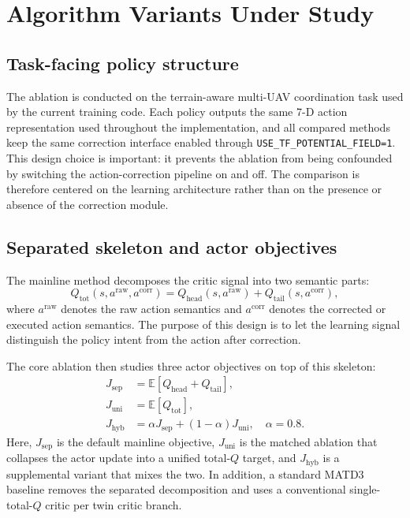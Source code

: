 \documentclass[a4paper,fleqn]{cas-dc}
\begin{document}
\section{Algorithm Variants Under Study}

\subsection{Task-facing policy structure}

The ablation is conducted on the terrain-aware multi-UAV coordination task used by the current training code. Each policy outputs the same 7-D action representation used throughout the implementation, and all compared methods keep the same correction interface enabled through \texttt{USE\_TF\_POTENTIAL\_FIELD=1}. This design choice is important: it prevents the ablation from being confounded by switching the action-correction pipeline on and off. The comparison is therefore centered on the learning architecture rather than on the presence or absence of the correction module.

\subsection{Separated skeleton and actor objectives}

The mainline method decomposes the critic signal into two semantic parts:
\begin{equation}
Q_{\text{tot}}(s, a^{\text{raw}}, a^{\text{corr}})
=
Q_{\text{head}}(s, a^{\text{raw}})
+
Q_{\text{tail}}(s, a^{\text{corr}}),
\label{eq:dual-q}
\end{equation}
where $a^{\text{raw}}$ denotes the raw action semantics and $a^{\text{corr}}$ denotes the corrected or executed action semantics. The purpose of this design is to let the learning signal distinguish the policy intent from the action after correction.

The core ablation then studies three actor objectives on top of this skeleton:
\begin{align}
J_{\text{sep}}   &= \mathbb{E}\!\left[Q_{\text{head}} + Q_{\text{tail}}\right], \\
J_{\text{uni}}   &= \mathbb{E}\!\left[Q_{\text{tot}}\right], \\
J_{\text{hyb}}   &= \alpha J_{\text{sep}} + (1-\alpha)J_{\text{uni}},
\quad \alpha = 0.8.
\end{align}
Here, $J_{\text{sep}}$ is the default mainline objective, $J_{\text{uni}}$ is the matched ablation that collapses the actor update into a unified total-$Q$ target, and $J_{\text{hyb}}$ is a supplemental variant that mixes the two. In addition, a standard MATD3 baseline removes the separated decomposition and uses a conventional single-total-$Q$ critic per twin critic branch.
\end{document}
